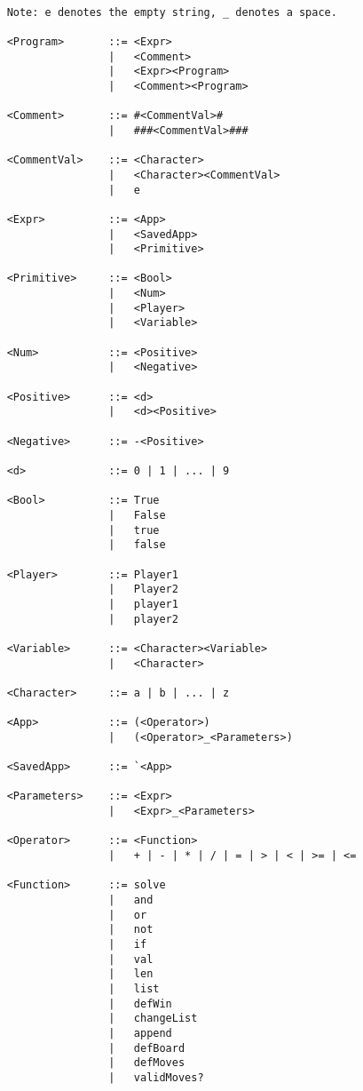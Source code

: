 \documentclass{article}
\begin{document}
\begin{verbatim}

    Note: e denotes the empty string, _ denotes a space.

    <Program>       ::= <Expr>
                    |   <Comment>
                    |   <Expr><Program>
                    |   <Comment><Program>

    <Comment>       ::= #<CommentVal>#
                    |   ###<CommentVal>###

    <CommentVal>    ::= <Character>
                    |   <Character><CommentVal>
                    |   e

    <Expr>          ::= <App>
                    |   <SavedApp>
                    |   <Primitive>

    <Primitive>     ::= <Bool>
                    |   <Num>
                    |   <Player>
                    |   <Variable>

    <Num>           ::= <Positive>
                    |   <Negative>

    <Positive>      ::= <d>
                    |   <d><Positive>

    <Negative>      ::= -<Positive>
    
    <d>             ::= 0 | 1 | ... | 9
    
    <Bool>          ::= True
                    |   False
                    |   true
                    |   false
    
    <Player>        ::= Player1
                    |   Player2
                    |   player1
                    |   player2
                    
    <Variable>      ::= <Character><Variable>
                    |   <Character>
                    
    <Character>     ::= a | b | ... | z

    <App>           ::= (<Operator>)
                    |   (<Operator>_<Parameters>)
                    
    <SavedApp>      ::= `<App>
    
    <Parameters>    ::= <Expr>
                    |   <Expr>_<Parameters>
                    
    <Operator>      ::= <Function>
                    |   + | - | * | / | = | > | < | >= | <=
                    
    <Function>      ::= solve
                    |   and
                    |   or
                    |   not
                    |   if
                    |   val
                    |   len
                    |   list
                    |   defWin
                    |   changeList
                    |   append
                    |   defBoard
                    |   defMoves
                    |   validMoves?
            
\end{verbatim}
\end{document}
